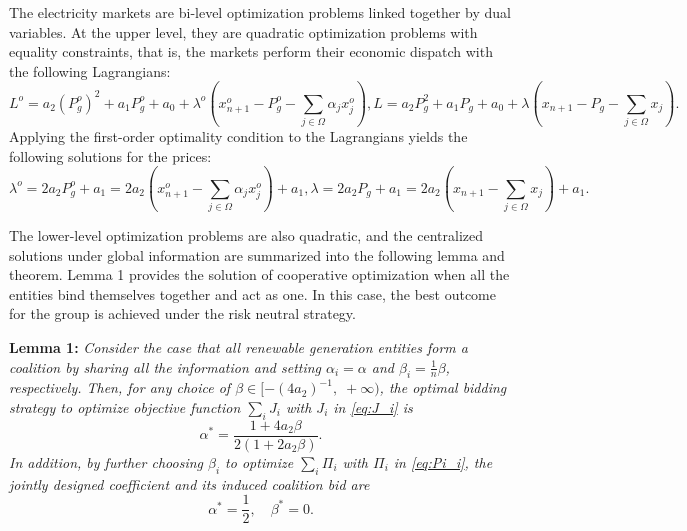 \documentclass[journal]{IEEEtran}
\begin{document}
The electricity markets are bi-level optimization problems linked together by dual variables. At the upper level, they are quadratic optimization problems with equality constraints, that is, the markets perform their economic dispatch with the following Lagrangians: 
\begin{subequations}
\begin{equation} 
L^o = a_2(P_g^o)^2+a_1P_g^o+a_0 + \lambda^o\left(x_{n+1}^o- P_g^o-\sum_{j\in\Omega} \alpha_j x_j^o \right), \label{eq:L*}
\end{equation}
\begin{equation} 
L = a_2P_g^2+a_1P_g+a_0 + \lambda\left(x_{n+1}-P_g-\sum_{j\in\Omega} x_j\right). \label{eq:L}
\end{equation}
\end{subequations}
Applying the first-order optimality condition to the Lagrangians yields the following solutions for the prices:
\begin{subequations}
\begin{equation} 
\lambda^o = 2a_2P_g^o +a_1 = 2a_2\left(x_{n+1}^o-\sum_{j\in\Omega} \alpha_j x_j^o \right) +a_1 , \label{eq:lambda*}
\end{equation}
\begin{equation} 
\lambda = 2a_2P_g+a_1=2a_2\left(x_{n+1}-\sum_{j\in\Omega} x_j \right) + a_1. \label{eq:lambda}
\end{equation}
\end{subequations}

The lower-level optimization problems are also quadratic, and the centralized solutions under global information are summarized into the following lemma and theorem. Lemma 1 provides the solution of cooperative optimization when all the entities bind themselves together and act as one. In this case, the best outcome for the group is achieved under the risk neutral strategy.

\noindent \textbf{Lemma 1:} {\it Consider the case that all renewable generation entities form a coalition by sharing all the information and setting $\alpha_i=\alpha$ and $\beta_i=\frac{1}{n}\beta$, respectively. Then, for any choice of $\beta\in[-(4a_2)^{-1},\; +\infty)$, the optimal bidding strategy to optimize objective function $\sum_i J_i$ with $J_i$ in \eqref{eq:J_i} is
\begin{equation}
\alpha^* = \frac{1 + 4a_2 \beta}{2(1 + 2a_2\beta)}.
\label{eq:alpha_1}
\end{equation}
In addition, by further choosing $\beta_i$ to optimize $\sum_i \Pi_i$ with $\Pi_i$ in \eqref{eq:Pi_i}, the jointly designed coefficient and its induced coalition bid are}
\begin{equation}
\alpha^*  =  \frac{1}{2}, \quad
\beta^*  =  0.
\label{eq:optimal_1}
\end{equation}
\end{document}
